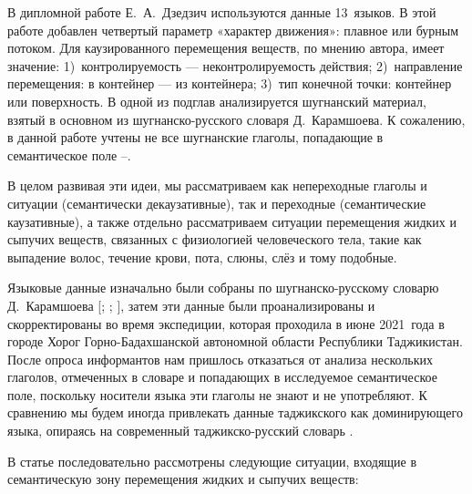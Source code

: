 В дипломной работе Е.~А.~Дзедзич используются данные 13~языков. В этой работе добавлен четвертый параметр «характер движения»: плавное или бурным потоком. Для каузированного перемещения веществ, по мнению автора, имеет значение: 1)~контролируемость — неконтролируемость действия; 2)~направление перемещения: в контейнер — из контейнера; 3)~тип конечной точки: контейнер или поверхность. В одной из подглав анализируется шугнанский материал, взятый в основном из шугнанско-русского словаря Д.~Карамшоева. К сожалению, в данной работе учтены не все шугнанские глаголы, попадающие в семантическое поле –.

В целом развивая эти идеи, мы рассматриваем как непереходные глаголы и ситуации (семантически декаузативные), так и переходные (семантические каузативные), а также отдельно рассматриваем ситуации перемещения жидких и сыпучих веществ, связанных с физиологией человеческого тела, такие как выпадение волос, течение крови, пота, слюны, слёз и тому подобные.

Языковые данные изначально были собраны по шугнанско-русскому словарю Д.~Карамшоева [\cite*{karamshoev1988}; \cite*{karamshoev1991}; \cite*{karamshoev1999}], затем эти данные были проанализированы и скорректированы во время экспедиции, которая проходила в июне 2021~года в городе Хорог Горно-Бадахшанской автономной области Республики Таджикистан. После опроса информантов нам пришлось отказаться от анализа нескольких глаголов, отмеченных в словаре и попадающих в исследуемое семантическое поле, поскольку носители языка эти глаголы не знают и не употребляют. К сравнению мы будем иногда привлекать данные таджикского как доминирующего языка, опираясь на современный таджикско-русский словарь \parencite{mirboboev2006}.

В статье последовательно рассмотрены следующие ситуации, входящие в семантическую зону перемещения жидких и сыпучих веществ:

\pagebreak[2]

